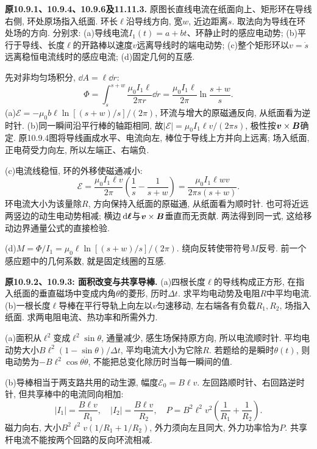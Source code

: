 \label{tb:wire-flux}
\begin{example}
\textbf{原10.9.1、10.9.4、10.9.6及11.11.3.} 
原图长直线电流在纸面向上、矩形环在导线右侧, 环处原场指入纸面. 环长$\ell$沿导线方向, 宽$w$, 近边距离$s$. 取法向为导线在环处场的方向. 分别求: (a)导线电流$I_1(t)=a+bt$、环静止时的感应电动势; (b)平行于导线、长度$\ell$的开路棒以速度$v$远离导线时的端电动势; (c)整个矩形环以$v=\dot s$远离稳恒电流线时的感应电流; (d)固定几何的互感.
\end{example}
\begin{solution}
先对非均匀场积分, $\dd A=\ell\dd r$:
\[\Phi=\int_s^{s+w}\frac{\mu_0I_1\ell}{2\pi r}\dd r
=\frac{\mu_0I_1\ell}{2\pi}\ln\frac{s+w}s.\]
(a)$\mathcal E=-\mu_0b\ell\ln[(s+w)/s]/(2\pi)$, 环流与增大的原磁通反向, 从纸面看为逆时针. (b)同一瞬间沿平行棒的轴距相同, 故$|\mathcal E|=\mu_0I_1\ell v/(2\pi s)$, 极性按$\boldsymbol{v}\times\boldsymbol{B}$确定. 原10.9.4图将导线画成水平、电流向左, 棒位于导线上方并向上远离; 场入纸面, 正电荷受力向左, 所以左端正、右端负.

(c)电流线稳恒, 环的外移使磁通减小:
\[\mathcal E=\frac{\mu_0I_1\ell v}{2\pi}\left(\frac1s-\frac1{s+w}\right)
=\frac{\mu_0I_1\ell wv}{2\pi s(s+w)}.\]
环电流大小为该量除$R$, 方向保持入纸面的原磁通, 从纸面看为顺时针. 也可将近远两竖边的动生电动势相减; 横边$\,\mathrm d\boldsymbol{\ell}$与$\boldsymbol{v}\times\boldsymbol{B}$垂直而无贡献. 两法得到同一式, 这给移动边界通量公式的直接检验.

(d)$M=\Phi/I_1=\mu_0\ell\ln[(s+w)/s]/(2\pi)$. 绕向反转使带符号$M$反号. 前一个感应题中的几何系数, 就是固定线圈的互感.
\end{solution}

\begin{example}
\textbf{原10.9.2、10.9.3: 面积改变与共享导棒.} 
(a)四根长度$\ell$的导线构成正方形, 在指入纸面的垂直磁场中变成内角$\theta$的菱形, 历时$\Delta t$. 求平均电动势及电阻$R$中平均电流. (b)一根长度$\ell$导棒在平行导轨上向左以$v$匀速移动, 左右端各有负载$R_1,R_2$, 场指入纸面. 求两电阻电流、热功率和所需外力.
\end{example}
\begin{solution}
(a)面积从$\ell^2$变成$\ell^2\sin\theta$, 通量减少, 感生场保持原方向, 所以电流顺时针. 平均电动势大小$B\ell^2(1-\sin\theta)/\Delta t$, 平均电流大小为它除$R$. 若题给的是瞬时$\theta(t)$, 则电动势为$-B\ell^2\cos\theta\dot\theta$, 不能把总变化除历时当每一瞬间的值.

(b)导棒相当于两支路共用的动生源, 幅度$\mathcal E_0=B\ell v$. 左回路顺时针、右回路逆时针, 但共享棒中的电流同向相加:
\[|I_1|=\frac{B\ell v}{R_1},\quad |I_2|=\frac{B\ell v}{R_2},\quad
P=B^2\ell^2v^2\left(\frac1{R_1}+\frac1{R_2}\right).\]
磁力向右, 大小$B^2\ell^2v(1/R_1+1/R_2)$, 外力须向左且同大, 外力功率恰为$P$. 共享杆电流不能按两个回路的反向环流相减.
\end{solution}

